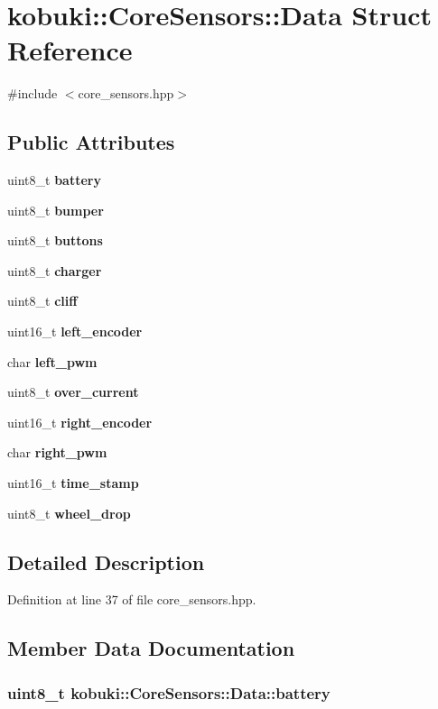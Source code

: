 \section{kobuki\-:\-:\-Core\-Sensors\-:\-:\-Data \-Struct \-Reference}
\label{structkobuki_1_1CoreSensors_1_1Data}


{\ttfamily \#include $<$core\-\_\-sensors.\-hpp$>$}

\subsection*{\-Public \-Attributes}
\begin{DoxyCompactItemize}
\item 
uint8\-\_\-t {\bf battery}
\item 
uint8\-\_\-t {\bf bumper}
\item 
uint8\-\_\-t {\bf buttons}
\item 
uint8\-\_\-t {\bf charger}
\item 
uint8\-\_\-t {\bf cliff}
\item 
uint16\-\_\-t {\bf left\-\_\-encoder}
\item 
char {\bf left\-\_\-pwm}
\item 
uint8\-\_\-t {\bf over\-\_\-current}
\item 
uint16\-\_\-t {\bf right\-\_\-encoder}
\item 
char {\bf right\-\_\-pwm}
\item 
uint16\-\_\-t {\bf time\-\_\-stamp}
\item 
uint8\-\_\-t {\bf wheel\-\_\-drop}
\end{DoxyCompactItemize}


\subsection{\-Detailed \-Description}


\-Definition at line 37 of file core\-\_\-sensors.\-hpp.



\subsection{\-Member \-Data \-Documentation}
\subsubsection[{battery}]{\setlength{\rightskip}{0pt plus 5cm}uint8\-\_\-t {\bf kobuki\-::\-Core\-Sensors\-::\-Data\-::battery}}\label{structkobuki_1_1CoreSensors_1_1Data_a6e2d199ac9856efb0da581cac93b9efe}


